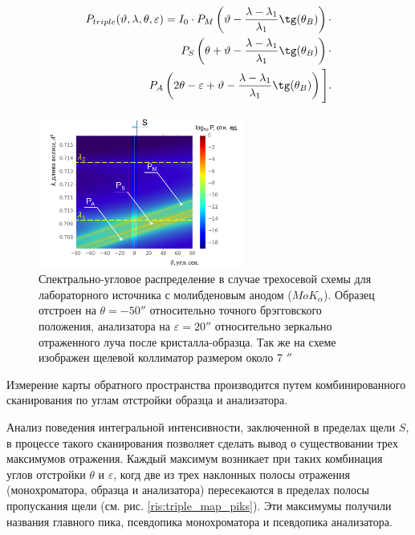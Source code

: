 \begin{eqnarray} \label{eq:triplr_spectra_angle_map}
  P_{triple}(\vartheta,\lambda,\theta,\varepsilon) =I_0\cdot
    P_M \left(\vartheta - \frac{\lambda - \lambda_1}{\lambda_1}\tg(\theta_B) \right) \cdot \nonumber \\
   P_S \left(\theta + \vartheta - \frac{\lambda - \lambda_1}{\lambda_1}\tg(\theta_B)\right)  \cdot  \nonumber \\
   P_A \left(2\theta - \varepsilon + \vartheta - \frac{\lambda - \lambda_1}{\lambda_1}\tg(\theta_B)\right) \Bigg].
 \end{eqnarray}

  \begin{figure}[H]
    \centering
    \includegraphics[width=0.6\textwidth]{images/triple_map.png}
    \caption{Спектрально-угловое распределение в случае трехосевой схемы
    для лабораторного источника с молибденовым анодом ($MoK_{\alpha}$).
    Образец отстроен на $\theta = - 50''$ относительно точного брэгговского положения,
    анализатора на $\varepsilon = 20''$ относительно
    зеркально отраженного луча после кристалла-образца. Так же на схеме изображен
    щелевой коллиматор размером около 7 $''$}
    \label{ris:triple_map}
  \end{figure}

Измерение карты обратного пространства производится путем комбинированного
сканирования по углам отстройки образца и анализатора.

Анализ поведения интегральной интенсивности, заключенной в пределах щели $S$,
в процессе такого сканирования позволяет сделать вывод о существовании трех
максимумов отражения. Каждый максимум возникает при таких комбинация углов отстройки
$\theta$ и $\varepsilon$, когд две из трех наклонных полосы отражения (монохроматора,
образца и анализатора) пересекаются в пределах полосы пропускания щели (см. рис. \ref{ris:triple_map_piks}).
Эти максимумы получили названия главного пика, псевдопика монохроматора и псевдопика анализатора.

